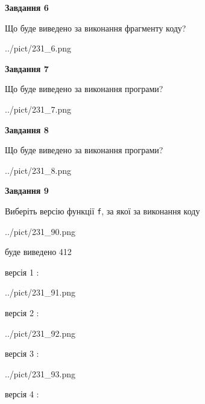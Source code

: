 \documentclass[12pt, ukrainian]{article}
\def\code#1{\Verb!#1!}
\begin{document}
{\begin {large}
{\begin {center}\textbf{Завдання 6}\end {center}}

Що буде виведено за виконання фрагменту коду?\par
\begin{center}
	{../pict/231_6.png}
\end{center}
\newpage

{\begin {center}\textbf{Завдання 7}\end {center}}

Що буде виведено за виконання програми?\par
\begin{center}
	{../pict/231_7.png}
\end{center}
\newpage

{\begin {center}\textbf{Завдання 8}\end {center}}

Що буде виведено за виконання програми?\par
\begin{center}
	{../pict/231_8.png}
\end{center}
\newpage

{\begin {center}\textbf{Завдання 9}\end {center}}

Виберіть версію функції \code{f}, за якої за виконання коду
\begin{center}
	{../pict/231_90.png}
\end{center}
буде виведено 412

\vspace{5mm}
версія 1 :

\begin{center}
	{../pict/231_91.png}
\end{center}
версія 2 :

\begin{center}
	{../pict/231_92.png}
\end{center}
версія 3 :

\begin{center}
	{../pict/231_93.png}
\end{center}
версія 4 :


\end{large}}
\end{document}
